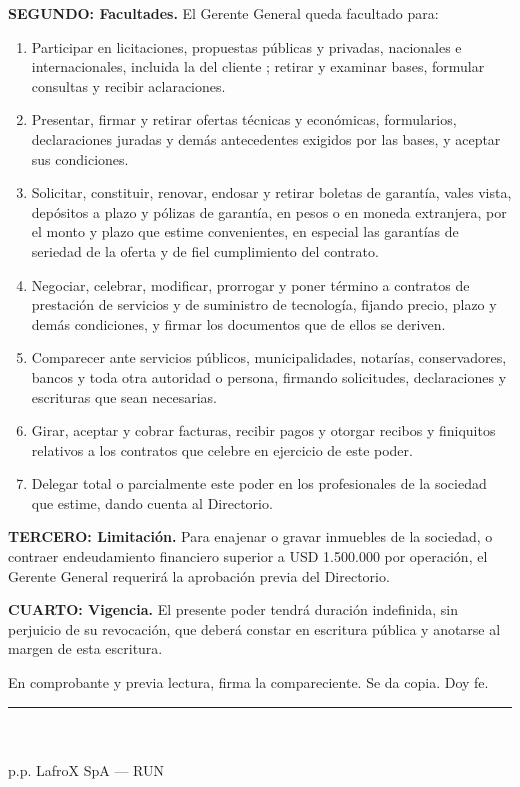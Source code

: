 \documentclass[11pt]{article}
\newcommand{\clau}[2]{\par\needspace{4\baselineskip}\textbf{#1.} #2\par}
\begin{document}
\clau{SEGUNDO: Facultades}{El Gerente General queda facultado para:}
\begin{enumerate}[label=\arabic*)]
  \item Participar en licitaciones, propuestas públicas y privadas, nacionales e internacionales, incluida la \LFXlicitacion{} del cliente \LFXcliente; retirar y examinar bases, formular consultas y recibir aclaraciones.
  \item Presentar, firmar y retirar ofertas técnicas y económicas, formularios, declaraciones juradas y demás antecedentes exigidos por las bases, y aceptar sus condiciones.
  \item Solicitar, constituir, renovar, endosar y retirar boletas de garantía, vales vista, depósitos a plazo y pólizas de garantía, en pesos o en moneda extranjera, por el monto y plazo que estime convenientes, en especial las garantías de seriedad de la oferta y de fiel cumplimiento del contrato.
  \item Negociar, celebrar, modificar, prorrogar y poner término a contratos de prestación de servicios y de suministro de tecnología, fijando precio, plazo y demás condiciones, y firmar los documentos que de ellos se deriven.
  \item Comparecer ante servicios públicos, municipalidades, notarías, conservadores, bancos y toda otra autoridad o persona, firmando solicitudes, declaraciones y escrituras que sean necesarias.
  \item Girar, aceptar y cobrar facturas, recibir pagos y otorgar recibos y finiquitos relativos a los contratos que celebre en ejercicio de este poder.
  \item Delegar total o parcialmente este poder en los profesionales de la sociedad que estime, dando cuenta al Directorio.
\end{enumerate}

\clau{TERCERO: Limitación}{Para enajenar o gravar inmuebles de la sociedad, o contraer endeudamiento financiero superior a USD 1.500.000 por operación, el Gerente General requerirá la aprobación previa del Directorio.}
\clau{CUARTO: Vigencia}{El presente poder tendrá duración indefinida, sin perjuicio de su revocación, que deberá constar en escritura pública y anotarse al margen de esta escritura.}

En comprobante y previa lectura, firma la compareciente. Se da copia. Doy fe.

\vspace{14pt}
\begin{center}\rule{6cm}{0.4pt}\\\SIMpresidenta\\ p.p. LafroX SpA --- RUN \SIMpresidentarun\end{center}
\end{document}
